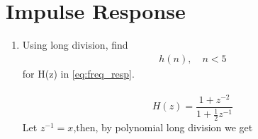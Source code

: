 \documentclass[journal,12pt,twocolumn]{IEEEtran}
\renewcommand\thesection{\arabic{section}}
\begin{document}
\section{Impulse Response}
\begin{enumerate}[label=\thesection.\arabic*]
	\item Using long division, 
find
		\begin{align}
			h(n), \quad n < 5
		\end{align}
		for H(z) in 
		\eqref{eq:freq_resp}.
		\\\solution\\
		\begin{equation}
			H(z) = \frac{1 + z^{-2}}{1 + \frac{1}{2} z^{-1}}
		\end{equation}
		Let $z^{-1} = x$,then, by polynomial long division we get
		

\end{enumerate}
\end{document}
